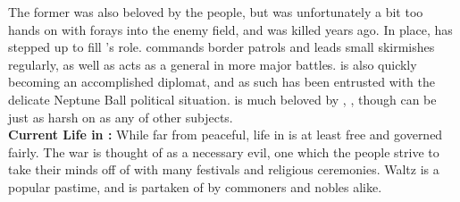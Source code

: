 \documentclass[blue]{NeptuneBall}
\begin{document}
The former \cPacificanRulerSpouse{\King} \cPacificanRulerSpouse{} was also beloved by the people, but was unfortunately a bit too hands on with \cPacificanRulerSpouse{\their} forays into the enemy field, and was killed years ago. In \cPacificanRulerSpouse{\their} place, \cPrince{\Prince} \cPrince{} has stepped up to fill \cPrince{\their} \cPacificanRulerSpouse{\parent}'s role. \cPrince{} commands border patrols and leads small skirmishes regularly, as well as acts as a general in more major battles. \cPrince{} is also quickly becoming an accomplished diplomat, and as such has been entrusted with the delicate Neptune Ball political situation. \cPrince{\they} is much beloved by \cPrince{\their} \cPacificanRuler{\parent}, \cPacificanRuler{\King} \cPacificanRuler{}, though \cPacificanRuler{\they} can be just as harsh on \cPrince{} as any of \cPacificanRuler{\their} other subjects.\\

{\bf Current Life in \pPacifica{}:}
While far from peaceful, life in \pPacifica{} is at least free and governed fairly. The war is thought of as a necessary evil, one which the people strive to take their minds off of with many festivals and religious ceremonies. Waltz is a popular pastime, and is partaken of by commoners and nobles alike.
\end{document}
